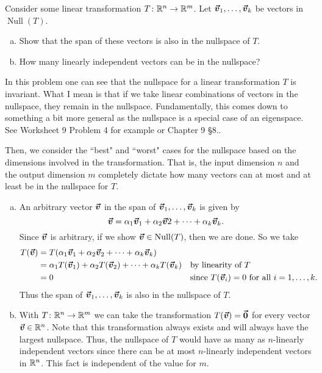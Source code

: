 \documentclass[12pt]{article} %
\begin{document}
\newpage
\begin{problem}
Consider some linear transformation $T\colon \mathbb{R}^n \to \mathbb{R}^m$.  Let $\boldsymbol{\vec{v}}_1, \dots, \boldsymbol{\vec{v}}_k$ be vectors in $\operatorname{Null}(T)$.  
\begin{enumerate}[(a)]
    \item Show that the span of these vectors is also in the nullspace of $T$.
    \item How many linearly independent vectors can be in the nullspace?
\end{enumerate}
\end{problem}
\begin{solution} In this problem one can see that the nullspace for a linear transformation $T$ is invariant.  What I mean is that if we take linear combinations of vectors in the nullspace, they remain in the nullspace.  Fundamentally, this comes down to something a bit more general as the nullspace is a special case of an eigenspace. See Worksheet 9 Problem 4 for example or Chapter 9 \S 8..  

Then, we consider the ``best" and ``worst" cases for the nullspace based on the dimensions involved in the transformation.  That is, the input dimension $n$ and the output dimension $m$ completely dictate how many vectors can at most and at least be in the nullspace for $T$.

\begin{enumerate}[(a)]
    \item An arbitrary vector $\boldsymbol{\vec{v}}$ in the span of $\boldsymbol{\vec{v}}_1,\dots,\boldsymbol{\vec{v}}_k$ is given by
    \[
    \boldsymbol{\vec{v}}= \alpha_1 \boldsymbol{\vec{v}}_1 + \alpha_2 \boldsymbol{\vec{v}} 2 + \cdots + \alpha_k \boldsymbol{\vec{v}}_k.
    \]
    Since $\boldsymbol{\vec{v}}$ is arbitrary, if we show $\boldsymbol{\vec{v}} \in \operatorname{Null}(T)$, then we are done.  So we take
    \begin{align*}
        T(\boldsymbol{\vec{v}}) &= T(\alpha_1 \boldsymbol{\vec{v}}_1 + \alpha_2 \boldsymbol{\vec{v}}_2 + \cdots + \alpha_k \boldsymbol{\vec{v}}_k )\\
        &= \alpha_1 T(\boldsymbol{\vec{v}}_1) + \alpha_2 T(\boldsymbol{\vec{v}}_2) + \cdots + \alpha_k T(\boldsymbol{\vec{v}}_k) && \textrm{by linearity of $T$}\\
        &= 0 &&\textrm{since $T(\boldsymbol{\vec{v}}_i)=0$ for all $i=1,\dots, k$.}
    \end{align*}
    Thus the span of $\boldsymbol{\vec{v}}_1,\dots,\boldsymbol{\vec{v}}_k$ is also in the nullspace of $T$.
    \item With $T\colon \mathbb{R}^n \to \mathbb{R}^m$ we can take the transformation $T(\boldsymbol{\vec{v}})=\boldsymbol{\vec{0}}$ for every vector $\boldsymbol{\vec{v}} \in \mathbb{R}^n$.  Note that this transformation always exists and will always have the largest nullspace.  Thus, the nullspace of $T$ would have as many as $n$-linearly independent vectors since there can be at most $n$-linearly independent vectors in $\mathbb{R}^n$. This fact is independent of the value for $m$.


\end{enumerate}
\end{solution}
\end{document}
